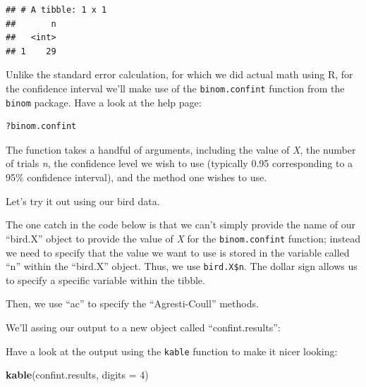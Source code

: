 \documentclass[
]{book}
\newenvironment{Shaded}{\begin{snugshade}}{\end{snugshade}}
\newcommand{\AttributeTok}[1]{\textcolor[rgb]{0.13,0.29,0.53}{#1}}
\newcommand{\DecValTok}[1]{\textcolor[rgb]{0.00,0.00,0.81}{#1}}
\newcommand{\FloatTok}[1]{\textcolor[rgb]{0.00,0.00,0.81}{#1}}
\newcommand{\FunctionTok}[1]{\textcolor[rgb]{0.13,0.29,0.53}{\textbf{#1}}}
\newcommand{\NormalTok}[1]{#1}
\newcommand{\OtherTok}[1]{\textcolor[rgb]{0.56,0.35,0.01}{#1}}
\newcommand{\SpecialCharTok}[1]{\textcolor[rgb]{0.81,0.36,0.00}{\textbf{#1}}}
\newcommand{\StringTok}[1]{\textcolor[rgb]{0.31,0.60,0.02}{#1}}
\begin{document}
\begin{verbatim}
## # A tibble: 1 x 1
##       n
##   <int>
## 1    29
\end{verbatim}

Unlike the standard error calculation, for which we did actual math using R, for the confidence interval we'll make use of the \texttt{binom.confint} function from the \texttt{binom} package. Have a look at the help page:

\begin{verbatim}
?binom.confint
\end{verbatim}

The function takes a handful of arguments, including the value of \emph{X}, the number of trials \emph{n}, the confidence level we wish to use (typically 0.95 corresponding to a 95\% confidence interval), and the method one wishes to use.

Let's try it out using our bird data.

The one catch in the code below is that we can't simply provide the name of our ``bird.X'' object to provide the value of \emph{X} for the \texttt{binom.confint} function; instead we need to specify that the value we want to use is stored in the variable called ``n'' within the ``bird.X'' object. Thus, we use \texttt{bird.X\$n}. The dollar sign allows us to specify a specific variable within the tibble.

Then, we use ``ac'' to specify the ``Agresti-Coull'' methods.

We'll assing our output to a new object called ``confint.results'':

\begin{Shaded}
\end{Shaded}

Have a look at the output using the \texttt{kable} function to make it nicer looking:

\begin{Shaded}
\begin{Highlighting}[]
\FunctionTok{kable}\NormalTok{(confint.results, }\AttributeTok{digits =} \DecValTok{4}\NormalTok{)}
\end{Highlighting}
\end{Shaded}
\end{document}
